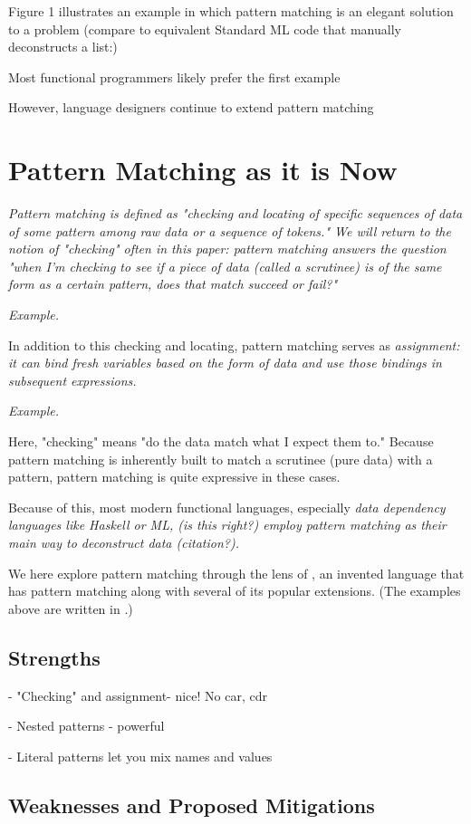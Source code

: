 \documentclass[manuscript,screen,review, 12pt]{acmart}
\begin{document}
Figure 1 illustrates an example in which pattern matching is an elegant solution
to a problem (compare to equivalent Standard ML code that manually deconstructs
a list:)


Most functional programmers likely prefer the first example 

However, language designers continue to extend pattern matching 

\section{Pattern Matching as it is Now}
\it{Pattern matching} is defined as "checking and locating of specific sequences
of data of some pattern among raw data or a sequence of tokens." We will return
to the notion of "checking" often in this paper: pattern matching answers the
question "when I'm checking to see if a piece of data (called a \it{scrutinee})
is of the same form as a certain pattern, does that match succeed or fail?"

\it{Example}.

In addition to this checking and locating, pattern matching serves as
\it{assignment}: it can bind fresh variables based on the form of data and use
those bindings in subsequent expressions. 

\it{Example}.

Here, "checking" means "do the data match what I expect them to." Because
pattern matching is inherently built to match a scrutinee (pure data) with a
pattern, pattern matching is quite expressive in these cases. 

Because of this, most modern functional languages, especially \it{data
dependency languages} like Haskell or ML, \it{(is this right?)} employ pattern
matching as their main way to deconstruct data (citation?). 

We here explore pattern matching through the lens of {\PPlus}, an invented
language that has pattern matching along with several of its popular extensions.
(The examples above are written in {\PPlus}.) 
\subsection{Strengths}

- "Checking" and assignment- nice! No car, cdr 

- Nested patterns - powerful 

- Literal patterns let you mix names and values 

\subsection{Weaknesses and Proposed Mitigations}
\end{document}
